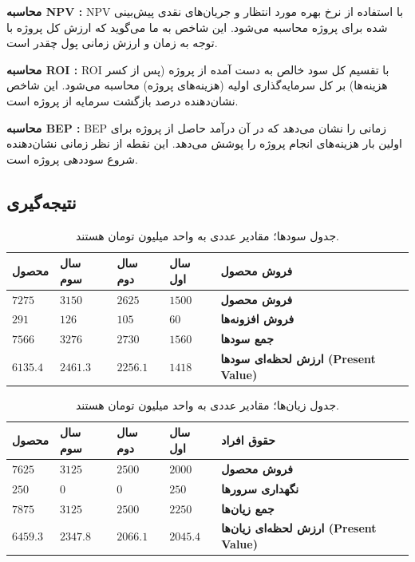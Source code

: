 \textbf{محاسبه NPV :} NPV با استفاده از نرخ بهره مورد انتظار و جریان‌های نقدی پیش‌بینی شده برای پروژه محاسبه می‌شود. این شاخص به ما می‌گوید که ارزش کل پروژه با توجه به زمان و ارزش زمانی پول چقدر است.

\textbf{محاسبه ROI :} ROI با تقسیم کل سود خالص به دست آمده از پروژه (پس از کسر هزینه‌ها) بر کل سرمایه‌گذاری اولیه (هزینه‌های پروژه) محاسبه می‌شود. این شاخص نشان‌دهنده درصد بازگشت سرمایه از پروژه است.

\textbf{محاسبه BEP :} BEP زمانی را نشان می‌دهد که در آن درآمد حاصل از پروژه برای اولین بار هزینه‌های انجام پروژه را پوشش می‌دهد. این نقطه از نظر زمانی نشان‌دهنده شروع سوددهی پروژه است.

\subsection{نتیجه‌گیری}

\begin{table}[h!]
	\centering
	\begin{tabular}{| m{2cm} | m{2cm} | m{2cm} | m{2cm} | m{2cm} |}
		\hline
		\textbf{محصول} & \textbf{سال سوم} & \textbf{سال دوم} & \textbf{سال اول} & \textbf{فروش محصول} \\
		\hline
		$7275$ & $3150$ & $2625$ & $1500$ & \textbf{فروش محصول} \\
		\hline
		$291$ & $126$ & $105$ & $60$ & \textbf{فروش افزونه‌ها} \\
		\hline
		$7566$ & $3276$ & $2730$ & $1560$ & \textbf{جمع سودها} \\
		\hline
		$6135.4$ & $2461.3$ & $2256.1$ & $1418$ & \textbf{ارزش لحظه‌ای سودها (Present Value)} \\
		\hline
	\end{tabular}
	\caption{جدول سودها؛ مقادیر عددی به واحد میلیون تومان هستند.}
	\label{table:profits}
\end{table}

\begin{table}[h!]
	\centering
	\begin{tabular}{| m{2cm} | m{2cm} | m{2cm} | m{2cm} | m{2cm} |}
		\hline
		\textbf{محصول} & \textbf{سال سوم} & \textbf{سال دوم} & \textbf{سال اول} & \textbf{حقوق افراد} \\
		\hline
		$7625$ & $3125$ & $2500$ & $2000$ & \textbf{فروش محصول} \\
		\hline
		$250$ & $0$ & $0$ & $250$ & \textbf{نگهداری سرورها} \\
		\hline
		$7875$ & $3125$ & $2500$ & $2250$ & \textbf{جمع زیان‌ها} \\
		\hline
		$6459.3$ & $2347.8$ & $2066.1$ & $2045.4$ & \textbf{ارزش لحظه‌ای زیان‌ها (Present Value)} \\
		\hline
	\end{tabular}
	\caption{جدول زیان‌ها؛ مقادیر عددی به واحد میلیون تومان هستند.}
	\label{table:losses}
\end{table}


